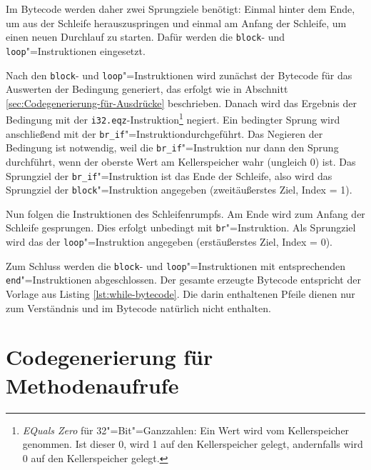 Im Bytecode werden daher zwei Sprungziele benötigt: Einmal hinter dem Ende, um aus der Schleife herauszuspringen und einmal am Anfang der Schleife, um einen neuen Durchlauf zu starten. Dafür werden die \lstinline{block}- und \lstinline{loop}"=Instruktionen eingesetzt.

Nach den \lstinline{block}- und \lstinline{loop}"=Instruktionen wird zunächst der Bytecode für das Auswerten der Bedingung generiert, das erfolgt wie in Abschnitt \ref{sec:Codegenerierung-für-Ausdrücke} beschrieben. Danach wird das Ergebnis der Bedingung mit der \lstinline{i32.eqz}-Instruktion\footnote{\emph{EQuals Zero} für 32"=Bit"=Ganzzahlen: Ein Wert wird vom Kellerspeicher genommen. Ist dieser 0, wird 1 auf den Kellerspeicher gelegt, andernfalls wird 0 auf den Kellerspeicher gelegt.} negiert. Ein bedingter Sprung wird anschließend mit der \lstinline{br_if}"=Instruktiondurchgeführt. Das Negieren der Bedingung ist notwendig, weil die \lstinline{br_if}"=Instruktion nur dann den Sprung durchführt, wenn der oberste Wert am Kellerspeicher wahr (ungleich 0) ist. Das Sprungziel der \lstinline{br_if}"=Instruktion ist das Ende der Schleife, also wird das Sprungziel der \lstinline{block}"=Instruktion angegeben (zweitäußerstes Ziel, Index = 1).

Nun folgen die Instruktionen des Schleifenrumpfs. Am Ende wird zum Anfang der Schleife gesprungen. Dies erfolgt unbedingt mit \lstinline{br}"=Instruktion. Als Sprungziel wird das der \lstinline{loop}"=Instruktion angegeben (erstäußerstes Ziel, Index = 0).

Zum Schluss werden die \lstinline{block}- und \lstinline{loop}"=Instruktionen mit entsprechenden \lstinline{end}"=Instruktionen abgeschlossen. Der gesamte erzeugte Bytecode entspricht der Vorlage aus Listing \ref{lst:while-bytecode}. Die darin enthaltenen Pfeile dienen nur zum Verständnis und im Bytecode natürlich nicht enthalten.



\section{Codegenerierung für Methodenaufrufe}
\label{sec:Codegenerierung-für-Methodenaufrufe}

